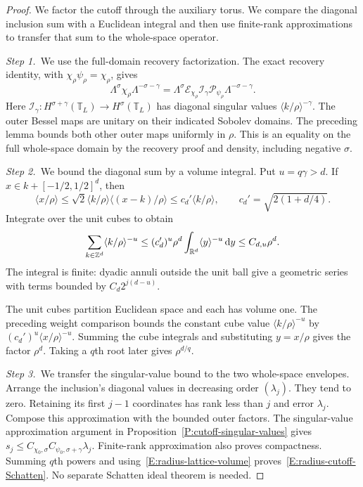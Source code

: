 \begin{proof}
  We factor the cutoff through the auxiliary torus. We compare the diagonal
  inclusion sum with a Euclidean integral and then use finite-rank
  approximations to transfer that sum to the whole-space operator.


  \medskip
  \noindent\textit{Step 1.~}We use the full-domain recovery factorization.
  The exact recovery identity, with $\chi_\rho\psi_\rho = \chi_\rho$, gives
  \[
    \Lambda^\sigma\chi_\rho\Lambda^{-\sigma-\gamma}
    =\Lambda^\sigma\mathcal{E}_{\chi_\rho}\mathcal{I}_\gamma
    \mathcal{P}_{\psi_\rho}\Lambda^{-\sigma-\gamma}.
  \]
  Here $\mathcal{I}_\gamma:H^{\sigma+\gamma}(\mathbb{T}_L) \to
  H^\sigma(\mathbb{T}_L)$ has diagonal singular values $\langle
  k/\rho\rangle^{-\gamma}$. The outer Bessel maps are unitary on their indicated
  Sobolev domains. The preceding lemma bounds both other outer maps uniformly in
  $\rho$. This is an equality on the full whole-space domain by the recovery
  proof and density, including negative $\sigma$.


  \medskip
  \noindent\textit{Step 2.~}We bound the diagonal sum by a volume integral.
  Put $u = q\gamma > d$. If $x \in k+[-1/2,1/2]^d$, then
  \[
    \langle x/\rho\rangle
    \le\sqrt2\langle k/\rho\rangle\langle(x-k)/\rho\rangle
    \le c_d'\langle k/\rho\rangle,\qquad
    c_d'=\sqrt{2(1+d/4)}.
  \]
  Integrate over the unit cubes to obtain
  \begin{equation}\label{E:radius-lattice-volume}
    \sum_{k\in\mathbb{Z}^d}\langle k/\rho\rangle^{-u}
    \le(c_d')^u\rho^d\int_{\mathbb{R}^d}\langle y\rangle^{-u}\,\mathrm{d} y
    \le C_{d,u}\rho^d .
  \end{equation}
  The integral is finite: dyadic annuli outside the unit ball give a geometric
  series with terms bounded by $C_d2^{j(d-u)}$.

  The unit cubes partition Euclidean space and each has volume one. The
  preceding weight comparison bounds the constant cube value $\langle
  k/\rho\rangle^{-u}$ by $(c_d')^u\langle x/\rho\rangle^{-u}$. Summing the
  cube integrals and substituting $y=x/\rho$ gives the factor $\rho^d$. Taking
  a $q$th root later gives $\rho^{d/q}$.

  \medskip
  \noindent\textit{Step 3.~}We transfer the singular-value bound to the two
  whole-space envelopes.
  Arrange the inclusion's diagonal values in decreasing order $(\lambda_j)$.
  They tend to zero. Retaining its first $j-1$ coordinates has rank less than
  $j$ and error $\lambda_j$. Compose this approximation with the bounded outer
  factors. The singular-value approximation argument in
  Proposition~\ref{P:cutoff-singular-values} gives $s_j \le
  C_{\chi_0,\sigma}C_{\psi_0,\sigma+\gamma}\lambda_j$. Finite-rank approximation
  also proves compactness. Summing $q$th powers and
  using~\eqref{E:radius-lattice-volume} proves~\eqref{E:radius-cutoff-Schatten}.
  No separate Schatten ideal theorem is needed.


\end{proof}
